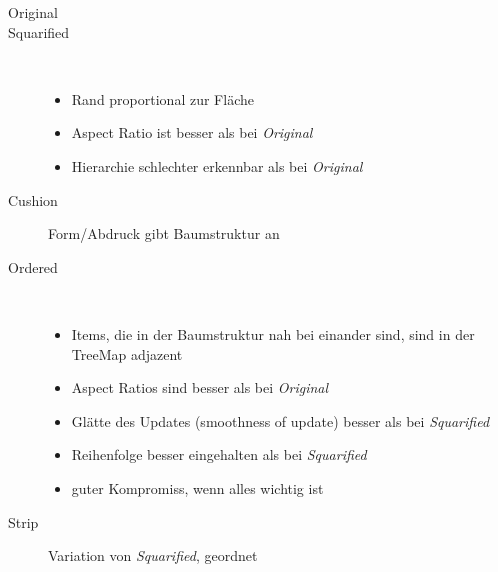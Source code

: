 \begin{description}
	\item[Original]
	\item[Squarified] \ \\\vspace*{-\baselineskip}
		\begin{itemize}
			\item Rand proportional zur Fläche
			\item Aspect Ratio ist besser als bei \textit{Original}
			\item Hierarchie schlechter erkennbar als bei \textit{Original}
		\end{itemize}
	\item[Cushion] Form/Abdruck gibt Baumstruktur an
\end{description}
\topbreak
\vspace*{-1.5\baselineskip}
\begin{description}
	\item[Ordered] \ \\\vspace*{-\baselineskip}
		\begin{itemize}
			\item Items, die in der Baumstruktur nah bei einander sind, sind in der TreeMap adjazent
			\item Aspect Ratios sind besser als bei \textit{Original}
			\item Glätte des Updates (smoothness of update) besser als bei \textit{Squarified}
			\item Reihenfolge besser eingehalten als bei \textit{Squarified}
			\item guter Kompromiss, wenn alles wichtig ist
		\end{itemize}
	\item[Strip] Variation von \textit{Squarified}, geordnet
\end{description}
